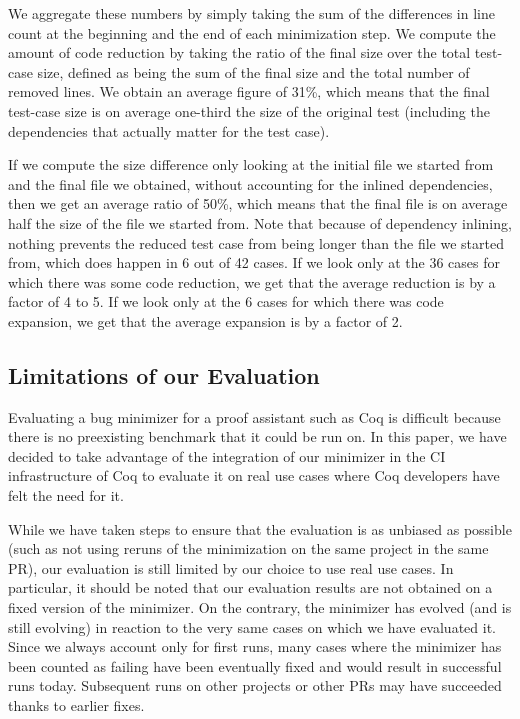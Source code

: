 \documentclass[a4paper,USenglish,cleveref,autoref,thm-restate]{lipics-v2021}
\begin{document}
We aggregate these numbers by simply taking the sum of the differences in line count at the beginning and the end of each minimization step. We compute the amount of code reduction by taking the ratio of the final size over the total test-case size, defined as being the sum of the final size and the total number of removed lines. We obtain an average figure of 31\%, which means that the final test-case size is on average one-third the size of the original test (including the dependencies that actually matter for the test case).

If we compute the size difference only looking at the initial file we started from and the final file we obtained, without accounting for the inlined dependencies, then we get an average ratio of 50\%, which means that the final file is on average half the size of the file we started from. Note that because of dependency inlining, nothing prevents the reduced test case from being longer than the file we started from, which does happen in 6 out of 42 cases. If we look only at the 36 cases for which there was some code reduction, we get that the average reduction is by a factor of 4 to 5. If we look only at the 6 cases for which there was code expansion, we get that the average expansion is by a factor of 2.

\subsection{Limitations of our Evaluation}

Evaluating a bug minimizer for a proof assistant such as Coq is difficult because there is no preexisting benchmark that it could be run on. In this paper, we have decided to take advantage of the integration of our minimizer in the CI infrastructure of Coq to evaluate it on real use cases where Coq developers have felt the need for it.

While we have taken steps to ensure that the evaluation is as unbiased as possible (such as not using reruns of the  minimization on the same project in the same PR), our evaluation is still limited by our choice to use real use cases. In particular, it should be noted that our evaluation results are not obtained on a fixed version of the minimizer. On the contrary, the minimizer has evolved (and is still evolving) in reaction to the very same cases on which we have evaluated it.
Since we always account only for first runs, many cases where the minimizer has been counted as failing have been eventually fixed and would result in successful runs today. Subsequent runs on other projects or other PRs may have succeeded thanks to earlier fixes.
\end{document}
